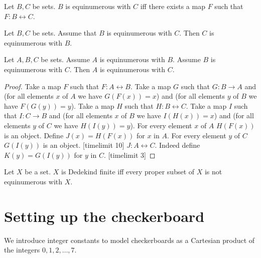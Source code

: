 \documentclass{article}
\begin{document}
\begin{forthel}
    
\begin{definition}
    Let $B, C$ be sets.
    $B$ is equinumerous with $C$ iff there exists a map $F$ such that
    $F : B\leftrightarrow C$.
\end{definition}
    
\begin{lemma}
    Let $B, C$ be sets.
    Assume that $B$ is equinumerous with $C$.
    Then $C$ is equinumerous with $B$.
\end{lemma}

\begin{lemma}
    Let $A, B, C$ be sets.
    Assume $A$ is equinumerous with $B$.
    Assume $B$ is equinumerous with $C$.
    Then $A$ is equinumerous with $C$.
\end{lemma}
\begin{proof}
    Take a map $F$ such that $F : A\leftrightarrow B$.
    Take a map $G$ such that $G : B\rightarrow A$ 
    and (for all elements $x$ of $A$ we have $G(F(x)) = x$) and
    (for all elements $y$ of $B$ we have $F(G(y))=y$).
    Take a map $H$ such that $H : B\leftrightarrow C$.
    Take a map $I$ such that $I : C\rightarrow B$ and (for all elements $x$ of $B$ we have $I(H(x)) = x$) and
    (for all elements $y$ of $C$ we have $H(I(y))=y$).
    For every element $x$ of $A$ $H(F(x))$ is an object.
    Define $J(x) = H(F(x))$ for $x$ in $A$.
    For every element $y$ of $C$ $G(I(y))$ is an object.
[timelimit 10]
    $J : A\leftrightarrow C$. Indeed define $K(y) = G(I(y))$ for $y$ in $C$.
[timelimit 3]
\end{proof}

\begin{definition}
    Let $X$ be a set.
    $X$ is Dedekind finite iff every proper subset of $X$
    is not equinumerous with $X$.
\end{definition}

\end{forthel}




\section{Setting up the checkerboard}

We introduce integer constants
to model checkerboards as a Cartesian product of the
integers $0, 1, 2, \ldots, 7$.
\end{document}
